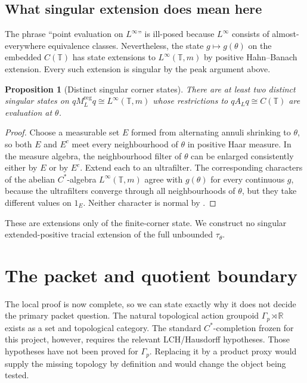 \documentclass[11pt]{article}
\newtheorem{proposition}[theorem]{Proposition}
\theoremstyle{definition}
\newcommand{\R}{\mathbb{R}}
\newcommand{\T}{\mathbb{T}}
\begin{document}
\subsection{What singular extension does mean here}

The phrase ``point evaluation on \(L^\infty\)'' is ill-posed because \(L^\infty\) consists of almost-everywhere equivalence classes.  Nevertheless, the state \(g\mapsto g(\theta)\) on the embedded \(C(\T)\) has state extensions to \(L^\infty(\T,m)\) by positive Hahn--Banach extension.  Every such extension is singular by the peak argument above.

\begin{proposition}[Distinct singular corner states]\label{prop:singular}
There are at least two distinct singular states on \(qM_L^{\mathrm{reg}}q\cong L^\infty(\T,m)\) whose restrictions to \(qA_Lq\cong C(\T)\) are evaluation at \(\theta\).
\end{proposition}

\begin{proof}
Choose a measurable set \(E\) formed from alternating annuli shrinking to \(\theta\), so both \(E\) and \(E^c\) meet every neighbourhood of \(\theta\) in positive Haar measure.  In the measure algebra, the neighbourhood filter of \(\theta\) can be enlarged consistently either by \(E\) or by \(E^c\).  Extend each to an ultrafilter.  The corresponding characters of the abelian \(C^*\)-algebra \(L^\infty(\T,m)\) agree with \(g(\theta)\) for every continuous \(g\), because the ultrafilters converge through all neighbourhoods of \(\theta\), but they take different values on \(1_E\).  Neither character is normal by .
\end{proof}

These are extensions only of the finite-corner state.  We construct no singular extended-positive tracial extension of the full unbounded \(\tau_\theta\).

\section{The packet and quotient boundary}

The local proof is now complete, so we can state exactly why it does not decide the primary packet question.  The natural topological action groupoid \(\Gamma_p\rtimes\R\) exists as a set and topological category.  The standard \(C^*\)-completion frozen for this project, however, requires the relevant LCH/Hausdorff hypotheses.  Those hypotheses have not been proved for \(\Gamma_p\).  Replacing it by a product proxy would supply the missing topology by definition and would change the object being tested.
\end{document}
